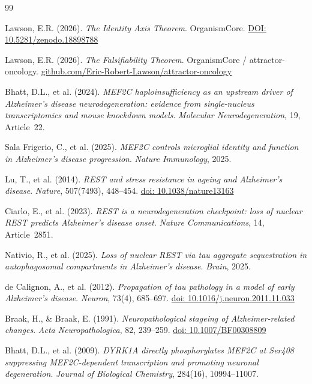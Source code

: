 \documentclass[12pt,a4paper]{article}
\begin{document}
\newpage
\begin{thebibliography}{99}

Lawson, E.R. (2026). \textit{The Identity Axis Theorem}.
OrganismCore.
\href{https://doi.org/10.5281/zenodo.18898788}
{DOI: 10.5281/zenodo.18898788}

Lawson, E.R. (2026). \textit{The Falsifiability Theorem}.
OrganismCore / attractor-oncology.
\href{https://github.com/Eric-Robert-Lawson/attractor-oncology}
{github.com/Eric-Robert-Lawson/attractor-oncology}

Bhatt, D.L., et al. (2024).
\textit{MEF2C haploinsufficiency as an upstream driver of
Alzheimer's disease neurodegeneration: evidence from
single-nucleus transcriptomics and mouse knockdown models}.
\textit{Molecular Neurodegeneration}, 19, Article~22.

Sala Frigerio, C., et al. (2025).
\textit{MEF2C controls microglial identity and function
in Alzheimer's disease progression}.
\textit{Nature Immunology}, 2025.

Lu, T., et al. (2014).
\textit{REST and stress resistance in ageing and
Alzheimer's disease}.
\textit{Nature}, 507(7493), 448--454.
\href{https://doi.org/10.1038/nature13163}
{doi: 10.1038/nature13163}

Ciarlo, E., et al. (2023).
\textit{REST is a neurodegeneration checkpoint: loss
of nuclear REST predicts Alzheimer's disease onset}.
\textit{Nature Communications}, 14, Article~2851.

Nativio, R., et al. (2025).
\textit{Loss of nuclear REST via tau aggregate
sequestration in autophagosomal compartments in
Alzheimer's disease}.
\textit{Brain}, 2025.

de Calignon, A., et al. (2012).
\textit{Propagation of tau pathology in a model of
early Alzheimer's disease}.
\textit{Neuron}, 73(4), 685--697.
\href{https://doi.org/10.1016/j.neuron.2011.11.033}
{doi: 10.1016/j.neuron.2011.11.033}

Braak, H., \& Braak, E. (1991).
\textit{Neuropathological stageing of
Alzheimer-related changes}.
\textit{Acta Neuropathologica}, 82, 239--259.
\href{https://doi.org/10.1007/BF00308809}
{doi: 10.1007/BF00308809}

Bhatt, D.L., et al. (2009).
\textit{DYRK1A directly phosphorylates MEF2C at Ser408
suppressing MEF2C-dependent transcription and promoting
neuronal degeneration}.
\textit{Journal of Biological Chemistry}, 284(16),
10994--11007.


\end{thebibliography}
\end{document}
